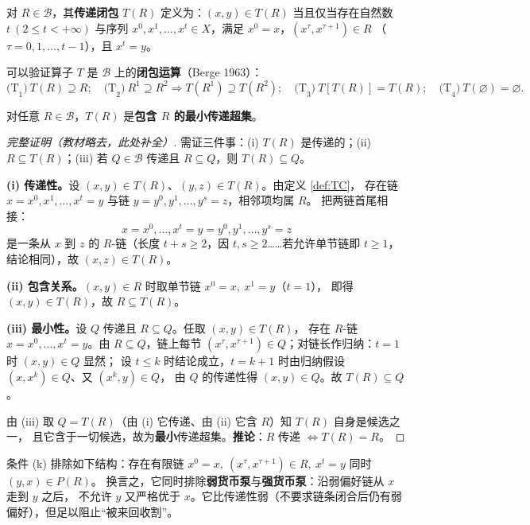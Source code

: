\begin{definition}[传递闭包]\label{def:TC}
对 $R\in\mathcal{B}$，其\textbf{传递闭包} $T(R)$ 定义为：$(x,y)\in T(R)$ 当且仅当存在自然数
$t\ (2\le t<+\infty)$ 与序列 $x^0,x^1,\dots,x^t\in X$，满足 $x^0=x$，$(x^\tau,x^{\tau+1})\in R$
（$\tau=0,1,\dots,t-1$），且 $x^t=y$。
\end{definition}

可以验证算子 $T$ 是 $\mathcal{B}$ 上的\textbf{闭包运算}（Berge 1963）：
\[
\text{(T}_1\text{)}\ T(R)\supseteq R;\quad
\text{(T}_2\text{)}\ R^1\supseteq R^2 \Rightarrow T(R^1)\supseteq T(R^2);\quad
\text{(T}_3\text{)}\ T[T(R)]=T(R);\quad
\text{(T}_4\text{)}\ T(\varnothing)=\varnothing.
\]

\begin{theorem}\label{thm:TC}
对任意 $R\in\mathcal{B}$，$T(R)$ 是\textbf{包含 $R$ 的最小传递超集}。
\end{theorem}

\begin{proof}[完整证明（教材略去，此处补全）]
需证三件事：(i) $T(R)$ 是传递的；(ii) $R\subseteq T(R)$；(iii) 若 $Q\in\mathcal{B}$
传递且 $R\subseteq Q$，则 $T(R)\subseteq Q$。

\textbf{(i) 传递性。}设 $(x,y)\in T(R)$、$(y,z)\in T(R)$。由定义 \ref{def:TC}，
存在链 $x=x^0,x^1,\dots,x^t=y$ 与链 $y=y^0,y^1,\dots,y^s=z$，相邻项均属 $R$。
把两链首尾相接：
\[
x=x^0,\dots,x^t=y=y^0,y^1,\dots,y^s=z
\]
是一条从 $x$ 到 $z$ 的 $R$-链（长度 $t+s\ge 2$，因 $t,s\ge 2$……若允许单节链即
$t\ge 1$，结论相同），故 $(x,z)\in T(R)$。

\textbf{(ii) 包含关系。}$(x,y)\in R$ 时取单节链 $x^0=x,\ x^1=y$（$t=1$），
即得 $(x,y)\in T(R)$，故 $R\subseteq T(R)$。

\textbf{(iii) 最小性。}设 $Q$ 传递且 $R\subseteq Q$。任取 $(x,y)\in T(R)$，
存在 $R$-链 $x=x^0,\dots,x^t=y$。由 $R\subseteq Q$，链上每节
$(x^\tau,x^{\tau+1})\in Q$；对链长作归纳：$t=1$ 时 $(x,y)\in Q$ 显然；
设 $t\le k$ 时结论成立，$t=k+1$ 时由归纳假设 $(x,x^k)\in Q$、又 $(x^k,y)\in Q$，
由 $Q$ 的传递性得 $(x,y)\in Q$。故 $T(R)\subseteq Q$。

由 (iii) 取 $Q=T(R)$（由 (i) 它传递、由 (ii) 它含 $R$）知 $T(R)$ 自身是候选之一，
且它含于一切候选，故为\textbf{最小}传递超集。\textbf{推论}：$R$ 传递
$\iff T(R)=R$。
\end{proof}

\begin{remark}
条件 (k) 排除如下结构：存在有限链 $x^0=x,\ (x^\tau,x^{\tau+1})\in R,\ x^t=y$ 同时 $(y,x)\in P(R)$。
换言之，它同时排除\textbf{弱货币泵}与\textbf{强货币泵}：沿弱偏好链从 $x$ 走到 $y$ 之后，
不允许 $y$ 又严格优于 $x$。它比传递性弱（不要求链条闭合后仍有弱偏好），但足以阻止“被来回收割”。
\end{remark}

